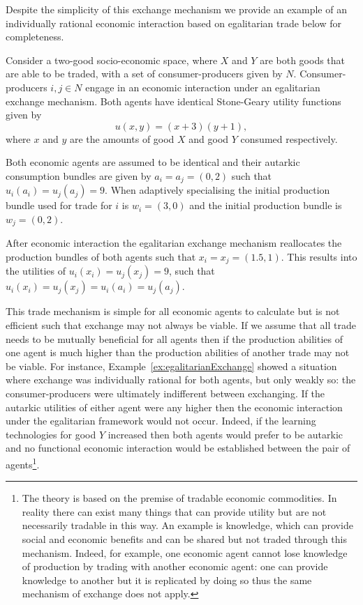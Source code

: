 Despite the simplicity of this exchange mechanism we provide an example of an individually rational economic interaction based on egalitarian trade below for completeness.
\begin{example} \label{ex:egalitarianExchange}
Consider a two-good socio-economic space, where $X$ and $Y$ are both goods that are able to be traded, with a set of consumer-producers given by $N$. Consumer-producers $i,j \in N$ engage in an economic interaction under an egalitarian exchange mechanism. Both agents have identical Stone-Geary utility functions given by
\begin{equation}
u(x,y) = (x + 3) (y + 1) ,
\end{equation}
where $x$ and $y$ are the amounts of good $X$ and good $Y$ consumed respectively.

Both economic agents are assumed to be identical and their autarkic consumption bundles are given by $a_{i} = a_{j} = (0, 2)$ such that $u_{i}(a_{i}) = u_{j}(a_{j}) = 9$. When adaptively specialising the initial production bundle used for trade for $i$ is $w_{i} = (3, 0)$ and the initial production bundle is $w_{j} = (0, 2)$.

After economic interaction the egalitarian exchange mechanism reallocates the production bundles of both agents such that $x_{i} = x_{j} = (1.5, 1)$. This results into the utilities of $u_{i}(x_{i}) = u_{j}(x_{j}) = 9$, such that $u_{i}(x_{i}) = u_{j}(x_{j}) = u_{i}(a_{i}) = u_{j}(a_{j})$.
\end{example}

This trade mechanism is simple for all economic agents to calculate but is not efficient such that exchange may not always be viable. If we assume that all trade needs to be mutually beneficial for all agents then if the production abilities of one agent is much higher than the production abilities of another trade may not be viable. For instance, Example~\ref{ex:egalitarianExchange} showed a situation where exchange was individually rational for both agents, but only weakly so: the consumer-producers were ultimately indifferent between exchanging. If the autarkic utilities of either agent were any higher then the economic interaction under the egalitarian framework would not occur. Indeed, if the learning technologies for good $Y$ increased then both agents would prefer to be autarkic and no functional economic interaction would be established between the pair of agents\footnote{The theory is based on the premise of tradable economic commodities. In reality there can exist many things that can provide utility but are not necessarily tradable in this way. An example is knowledge, which can provide social and economic benefits and can be shared but not traded through this mechanism. Indeed, for example, one economic agent cannot lose knowledge of production by trading with another economic agent: one can provide knowledge to another but it is replicated by doing so thus the same mechanism of exchange does not apply.}.

